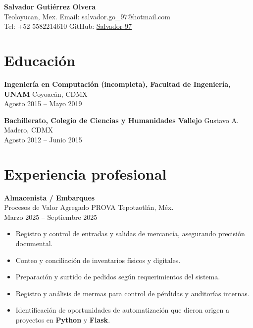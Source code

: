 \documentclass[11pt]{article}
\begin{document}
\begin{center}
    {\LARGE \textbf{Salvador Gutiérrez Olvera}} \\
    Teoloyucan, Mex. \hfill Email: salvador.go\_97@hotmail.com \\
    Tel: +52 5582214610 \hfill GitHub: \href{https://github.com/Salvador-97}{Salvador-97}
\end{center}

\vspace{6pt}

\section*{Educación}

\textbf{Ingeniería en Computación (incompleta), Facultad de Ingeniería, UNAM} \hfill Coyoacán, CDMX \\
Agosto 2015 -- Mayo 2019

\textbf{Bachillerato, Colegio de Ciencias y Humanidades Vallejo} \hfill Gustavo A. Madero, CDMX \\
Agosto 2012 -- Junio 2015

\vspace{6pt}

\section*{Experiencia profesional}

\textbf{Almacenista / Embarques} \\
Procesos de Valor Agregado PROVA \hfill Tepotzotlán, Méx. \\
Marzo 2025 -- Septiembre 2025
\begin{itemize}[leftmargin=*, noitemsep]
    \item Registro y control de entradas y salidas de mercancía, asegurando precisión documental.
    \item Conteo y conciliación de inventarios físicos y digitales.
    \item Preparación y surtido de pedidos según requerimientos del sistema.
    \item Registro y análisis de mermas para control de pérdidas y auditorías internas.
    \item Identificación de oportunidades de automatización que dieron origen a proyectos en \textbf{Python} y \textbf{Flask}.
\end{itemize}
\end{document}

